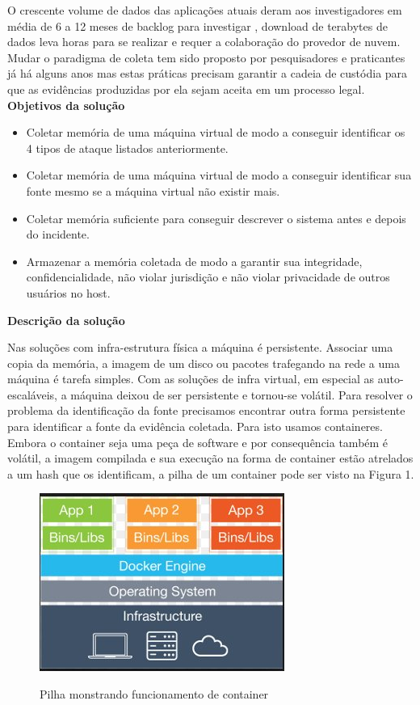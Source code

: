 \documentclass[
	12pt,				%
	openright,			%
	oneside,			%
	a4paper,			%
	english,			%
	french,				%
	spanish,			%
	brazil,				%
	]{abntex2}
\begin{document}
O crescente volume de dados das aplicações atuais deram aos investigadores em média de 6 a 12 meses de backlog para investigar \cite{Quick2014}, download de terabytes
de dados leva horas para se realizar e requer a colaboração do provedor de nuvem. Mudar o paradigma de coleta tem sido proposto por pesquisadores e praticantes já há alguns
anos \cite{Birk2011}\cite{Sang2013} mas estas práticas precisam garantir a cadeia de custódia para que as evidências produzidas por ela sejam aceita em um processo legal.\\

\textbf{Objetivos da solução}

\begin{itemize}
 \item Coletar memória de uma máquina virtual de modo a conseguir identificar os 4 tipos de ataque listados anteriormente.
 \item Coletar memória de uma máquina virtual de modo a conseguir identificar sua fonte mesmo se a máquina virtual não existir mais.
 \item Coletar memória suficiente para conseguir descrever o sistema antes e depois do incidente.
 \item Armazenar a memória coletada de modo a garantir sua integridade, confidencialidade, não violar jurisdição e não violar privacidade de outros usuários no host.\\
\end{itemize}

\textbf{Descrição da solução}

Nas soluções com infra-estrutura física a máquina é persistente. Associar uma copia da memória, a imagem de um disco ou pacotes trafegando na rede a uma máquina é tarefa simples.
Com as soluções de infra virtual, em especial as auto-escaláveis, a máquina deixou de ser persistente e tornou-se volátil. Para resolver o problema da identificação da fonte
precisamos encontrar outra forma persistente para identificar a fonte da evidência coletada. Para isto usamos containeres. Embora o container seja uma peça de software e 
por consequência também é volátil, a imagem compilada e sua execução na forma de container estão atrelados a um hash que os identificam, a pilha de um container pode ser 
visto na Figura 1. 

\begin{figure}[h]
\caption{Pilha monstrando funcionamento de container}
\includegraphics[scale=0.5]{docker.jpg}
\centering
\label{fig:instantaneo}
\end{figure}
\end{document}

